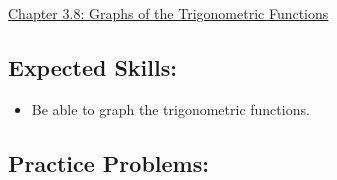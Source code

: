 \documentclass[12pt]{article}
\begin{document}
\begin{center}
\underline{\LARGE{Chapter 3.8: Graphs of the Trigonometric Functions}}
\end{center}

\subsection*{Expected Skills:}

\begin{itemize}

\item Be able to graph the trigonometric functions.

\end{itemize}

\subsection*{Practice Problems: }
\end{document}
